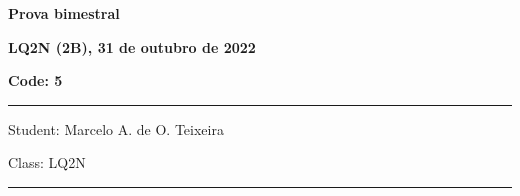 \documentclass[12pt, addpoints]{exam}
\begin{document}
        \begin{minipage}[b]{0.75\linewidth}
            \begin{flushleft}
                {\bf \large Prova bimestral}
            \end{flushleft}
            \begin{flushleft}
                {\bf \large LQ2N (2B), 31 de outubro de 2022}
            \end{flushleft}
        \end{minipage}
        \begin{minipage}[b]{0.20\linewidth}
            \begin{flushright}
                {\bf \large Code: 5}
            \end{flushright}
        \end{minipage}
        \vspace{0.5cm} \hrule \vspace{0.5cm}
        \begin{minipage}{0.75\linewidth}
            \begin{flushleft}
                Student: Marcelo A. de O. Teixeira
            \end{flushleft}
        \end{minipage}
        \begin{minipage}{0.20\linewidth}
            \begin{flushright}
                Class: LQ2N
            \end{flushright}
        \end{minipage}
        \vspace{0.5cm} \hrule \vspace{0.5cm}
\end{document}
